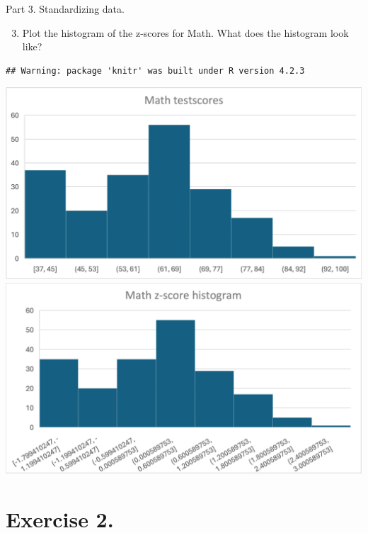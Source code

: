 \documentclass[
  10pt,
  ignorenonframetext,
]{beamer}
\providecommand{\tightlist}{%
  \setlength{\itemsep}{0pt}\setlength{\parskip}{0pt}}
\begin{document}
\begin{frame}[fragile]{Part 3. Standardizing data.}
\protect\hypertarget{part-3.-standardizing-data.-1}{}
\begin{enumerate}
\setcounter{enumi}{2}
\tightlist
\item
  Plot the histogram of the z-scores for Math. What does the histogram
  look like?
\end{enumerate}

\begin{verbatim}
## Warning: package 'knitr' was built under R version 4.2.3
\end{verbatim}

\begin{center}\includegraphics[width=0.45\linewidth,height=0.3\textheight]{pictures/Mathscores_hist} \includegraphics[width=0.45\linewidth,height=0.3\textheight]{pictures/zMathscores_hist} \end{center}
\end{frame}

\hypertarget{exercise-2.}{%
\section{Exercise 2.}\label{exercise-2.}}
\end{document}
